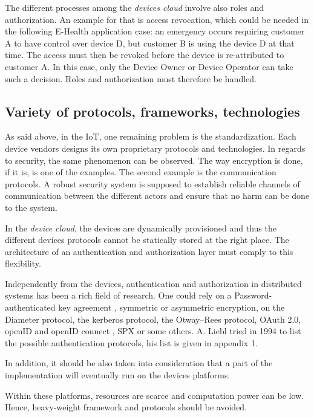 The different processes among the \emph{devices cloud} involve also roles and authorization. An example for that is access revocation, which could be needed in the following E-Health application case: an emergency occurs requiring customer A to have control over device D, but customer B is using the device D at that time. The access must then be revoked before the device is re-attributed to customer A. In this case, only the Device Owner or Device Operator can take such a decision. Roles and authorization must therefore be handled.

\subsection{Variety of protocols, frameworks, technologies}
As said above, in the IoT, one remaining problem is the standardization. Each device vendors designs its own proprietary protocols and technologies. In regards to security, the same phenomenon can be observed. The way encryption is done, if it is, is one of the examples. The second example is the communication protocols. A robust security system is supposed to establish reliable channels of communication between the different actors and ensure that no harm can be done to the system. 

In the \emph{device cloud}, the devices are dynamically provisioned and thus the different devices protocols cannot be statically stored at the right place. The architecture of an authentication and authorization layer must comply to this flexibility.

Independently from the devices, authentication and authorization in distributed systems has been a rich field of research. One could rely on a Password-authenticated key agreement \cite{Hao2011}\cite{Pointcheval2012}\cite{Juang2008}, symmetric or asymmetric encryption\cite{Denning1982}, on the Diameter protocol, the kerberos protocol\cite{neuman2005kerberos}, the Otway–Rees protocol, OAuth 2.0\cite{hardt2012oauth}, openID\cite{Ghazizadeh} and openID connect \cite{sakimura2014openid}, SPX\cite{Tardo1991} or some others. A. Liebl tried in 1994 to list the possible authentication protocols, his list is given in appendix 1\cite{Liebl1993}.

In addition, it should be also taken into consideration that a part of the implementation will eventually run on the devices platforms. 

Within these platforms, resources are scarce and computation power can be low. Hence, heavy-weight framework and protocols should be avoided.

